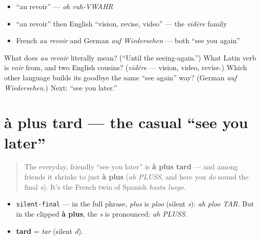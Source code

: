 \begin{itemize}
\raggedright
  \item \textquotedblleft{}au revoir\textquotedblright{} — \emph{oh ruh-VWAHR}
  \item \textquotedblleft{}au revoir\textquotedblright{} then English \textquotedblleft{}vision, revise, video\textquotedblright{} — the \emph{vidēre} family
  \item French \emph{au revoir} and German \emph{auf Wiedersehen} — both \textquotedblleft{}see you again\textquotedblright{}
\end{itemize}

\begin{tcolorbox}[breakable,colback=teal!4,colframe=teal!35!black,title={Before you move on}]
What does \emph{au revoir} literally mean? (\textquotedblleft{}Until the seeing-again.\textquotedblright{}) What Latin verb is \emph{voir} from, and two English cousins? (\emph{vidēre} — vision, video, revise.) Which other language builds its goodbye the same \textquotedblleft{}see again\textquotedblright{} way? (German \emph{auf Wiedersehen}.) Next: \textquotedblleft{}see you later.\textquotedblright{}
\end{tcolorbox}
\section[à plus tard]{à plus tard — the casual \textquotedblleft{}see you later\textquotedblright{}}

\label{lesson:FR-C04-a-plus-tard}



\begin{quote}
The everyday, friendly \textquotedblleft{}see you later\textquotedblright{} is \textbf{à plus tard} — and among friends it shrinks to just \textbf{à plus} (\emph{ah PLUSS}, and here you \emph{do} sound the final \emph{s}). It's the French twin of Spanish \emph{hasta luego}.
\end{quote}

\begin{sounds}
\begin{itemize}
\raggedright
  \item \texttt{silent-final} — in the full phrase, \emph{plus} is \emph{ploo} (silent \emph{s}): \emph{ah ploo TAR}. But in the clipped \textbf{à plus}, the \emph{s} is pronounced: \emph{ah PLUSS}.
  \item \textbf{tard} = \emph{tar} (silent \emph{d}).
\end{itemize}
\end{sounds}

